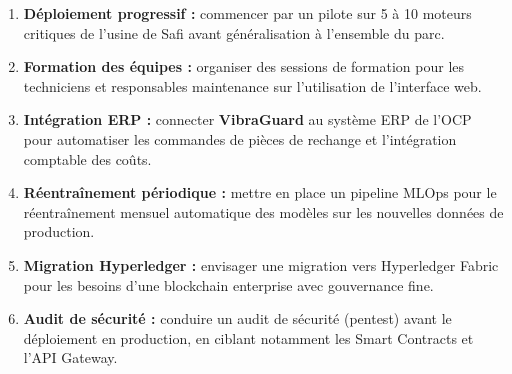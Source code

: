 \documentclass[12pt, a4paper, oneside]{report}
\newif\ifinmainchapters
\newcommand{\projectname}{\textbf{VibraGuard}}
\begin{document}
\begin{enumerate}
  \item \textbf{Déploiement progressif :} commencer par un pilote sur 5 à 10 moteurs
  critiques de l'usine de Safi avant généralisation à l'ensemble du parc.
  \item \textbf{Formation des équipes :} organiser des sessions de formation pour les
  techniciens et responsables maintenance sur l'utilisation de l'interface web.
  \item \textbf{Intégration ERP :} connecter \projectname{} au système ERP de l'OCP pour
  automatiser les commandes de pièces de rechange et l'intégration comptable des coûts.
  \item \textbf{Réentraînement périodique :} mettre en place un pipeline MLOps pour le
  réentraînement mensuel automatique des modèles sur les nouvelles données de production.
  \item \textbf{Migration Hyperledger :} envisager une migration vers Hyperledger Fabric
  pour les besoins d'une blockchain enterprise avec gouvernance fine.
  \item \textbf{Audit de sécurité :} conduire un audit de sécurité (pentest) avant le
  déploiement en production, en ciblant notamment les Smart Contracts et l'API Gateway.
\end{enumerate}



%
\inmainchaptersfalse
\end{document}
